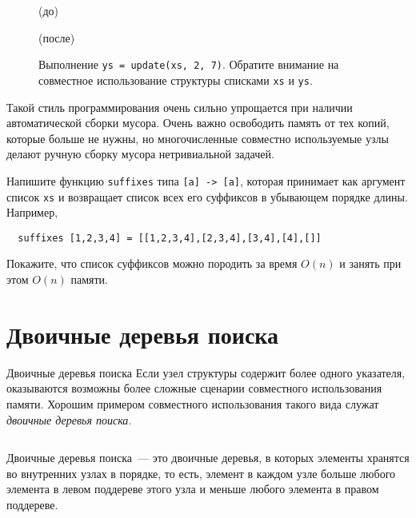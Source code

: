 \begin{frame}[fragile]{}
\begin{figure}[h]
	\centering
	\par
	(до)\par
	\vspace{0.5cm}
	\par
	(после)\par
	\vspace{0.5cm}	
	\caption{Выполнение \texttt{ys = update(xs, 2, 7)}. Обратите
		внимание на совместное использование структуры списками \texttt{xs} и \texttt{ys}.}
	\label{fig:2.6}
\end{figure}
\end{frame}

\begin{frame}[fragile]
\begin{remark}
	Такой стиль программирования очень сильно упрощается при наличии
	автоматической сборки мусора. Очень важно освободить память от тех
	копий, которые больше не нужны, но многочисленные совместно используемые
	узлы делают ручную сборку мусора нетривиальной задачей.
\end{remark}
\begin{exercise}\label{ex:2.1}
  Напишите функцию \texttt{suffixes} типа \texttt{[a] -> [a]}, которая принимает как
  аргумент список \texttt{xs} и возвращает список всех его
  суффиксов в убывающем порядке длины. Например,
  \begin{verbatim}
  suffixes [1,2,3,4] = [[1,2,3,4],[2,3,4],[3,4],[4],[]]
  \end{verbatim}
  Покажите, что список суффиксов можно породить за время $O(n)$ и
  занять при этом $O(n)$ памяти.
\end{exercise}

\end{frame}

\section{Двоичные деревья поиска}
\label{sc:2.2}

\begin{frame}{Двоичные деревья поиска}
Если узел структуры содержит более одного указателя, оказываются
возможны более сложные сценарии совместного использования памяти. Хорошим примером
совместного использования такого вида служат \emph{двоичные деревья поиска}.

\inputminted[firstline=10, lastline=10] {haskell}{code/SearchTree.hs}

Двоичные деревья поиска~--- это двоичные деревья, в которых элементы
хранятся во внутренних узлах в 
порядке, то есть, элемент в каждом узле больше любого элемента в
левом поддереве этого узла и меньше любого элемента в правом
поддереве.
\end{frame}

